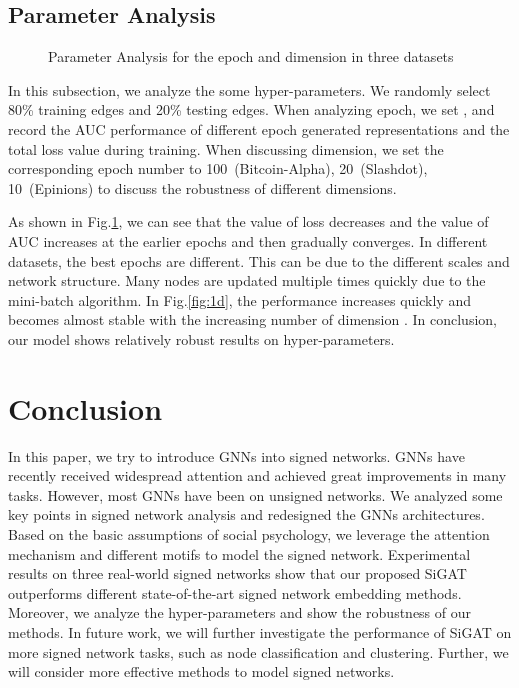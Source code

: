 \documentclass[runningheads]{llncs}
\begin{document}
\subsection{Parameter Analysis}
\vspace{-20px}
\begin{figure}[H]
\setlength{\leftskip}{-40pt}
   \noindent {}
    \caption{Parameter Analysis for the epoch and dimension in three datasets}
    \label{fig:auc_loss}
 \vspace{-10px}
\end{figure}
In this subsection, we analyze the some hyper-parameters. 
We randomly select 80\% training edges and 20\% testing edges.
When analyzing epoch, we set , and record the AUC performance of different epoch generated representations and the total loss value during training.
When discussing dimension, we set the corresponding epoch number to 100~(Bitcoin-Alpha), 20~(Slashdot), 10~(Epinions) to discuss the robustness of different dimensions. 

As shown in Fig.\ref{fig:auc_loss}, we can see that the value of loss decreases and the value of AUC increases at the earlier epochs and then gradually converges. In different datasets, the best epochs are different. This can be due to the different scales and network structure. Many nodes are updated multiple times quickly due to the mini-batch algorithm. 
In Fig.\ref{fig:1d}, the performance increases quickly and becomes almost stable with the increasing number of dimension . In conclusion, our model shows relatively robust results on hyper-parameters. 
\section{Conclusion}\label{sec:conclusion}
In this paper, we try to introduce GNNs into signed networks. 
GNNs have recently received widespread attention and achieved great improvements in many tasks.
However, most GNNs have been on unsigned networks.
We analyzed some key points in signed network analysis and redesigned the GNNs architectures. 
Based on the basic assumptions of social psychology, we leverage the attention mechanism and different motifs to model the signed network. 
Experimental results on three real-world signed networks show that our proposed SiGAT outperforms different state-of-the-art signed network embedding methods. 
Moreover, we analyze the hyper-parameters and show the robustness of our methods.
In future work, we will further investigate the performance of SiGAT on more signed network tasks, such as node classification and clustering. Further, we will consider more effective methods to model signed networks. 
\end{document}
